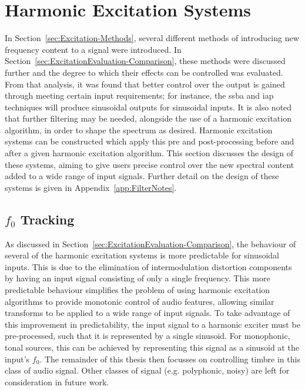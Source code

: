 \section{Harmonic Excitation Systems}
\label{sec:FeatureControl-Systems}
	In Section~\ref{sec:Excitation-Methods}, several different methods of introducing new frequency content to a signal
	were introduced. In Section~\ref{sec:ExcitationEvaluation-Comparison}, these methods were discussed further and the
	degree to which their effects can be controlled was evaluated. From that analysis, it was found that better control
	over the output is gained through meeting certain input requirements; for instance, the \acrshort{ssba} and
	\acrshort{iap} techniques will produce sinusoidal outputs for sinusoidal inputs. It is also noted that further
	filtering may be needed, alongside the use of a harmonic excitation algorithm, in order to shape the spectrum as
	desired. Harmonic excitation systems can be constructed which apply this pre and post-processing before and after a
	given harmonic excitation algorithm. This section discusses the design of these systems, aiming to give users
	precise control over the new spectral content added to a wide range of input signals. Further detail on the design
	of these systems is given in Appendix~\ref{app:FilterNotes}.

	\subsection{$f_{0}$ Tracking}
	\label{sec:FeatureControl-Systems-Fundamental}
		As discussed in Section~\ref{sec:ExcitationEvaluation-Comparison}, the behaviour of several of the harmonic
		excitation systems is more predictable for sinusoidal inputs. This is due to the elimination of
		intermodulation distortion components by having an input signal consisting of only a single frequency. This
		more predictable behaviour simplifies the problem of using harmonic excitation algorithms to provide
		monotonic control of audio features, allowing similar transforms to be applied to a wide range of input
		signals. To take advantage of this improvement in predictability, the input signal to a harmonic exciter
		must be pre-processed, such that it is represented by a single sinusoid. For monophonic, tonal sources,
		this can be achieved by representing this signal as a sinusoid at the input's $f_{0}$. The remainder of
		this thesis then focusses on controlling timbre in this class of audio signal. Other classes of signal
		(e.g. polyphonic, noisy) are left for consideration in future work.
		
